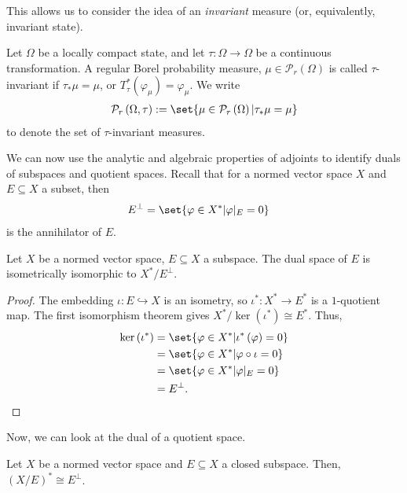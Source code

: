 \documentclass[10pt]{mypackage}
\begin{document}
This allows us to consider the idea of an \textit{invariant} measure (or, equivalently, invariant state).
\begin{definition}
  Let $\Omega$ be a locally compact state, and let $\tau: \Omega\rightarrow\Omega$ be a continuous transformation. A regular Borel probability measure, $\mu\in \mathcal{P}_r\left(\Omega\right)$ is called $\tau$-invariant if $\tau_{\ast}\mu = \mu$, or $T_{\tau}^{\ast}\left(\varphi_{\mu}\right) = \varphi_{\mu}$. We write
  \begin{align*}
    \mathcal{P}_{r}\left(\Omega,\tau\right) := \set{\mu\in \mathcal{P}_{r}\left(\Omega\right)| \tau_{\ast}\mu = \mu}
  \end{align*}
  to denote the set of $\tau$-invariant measures.
\end{definition}
We can now use the analytic and algebraic properties of adjoints to identify duals of subspaces and quotient spaces. Recall that for a normed vector space $X$ and $E\subseteq X$ a subset, then
\begin{align*}
  E^{\perp} &= \set{\varphi\in X^{\ast}| \varphi|_{E} = 0}
\end{align*}
is the annihilator of $E$.
\begin{proposition}
  Let $X$ be a normed vector space, $E\subseteq X$ a subspace. The dual space of $E$ is isometrically isomorphic to $X^{\ast}/E^{\perp}$.
\end{proposition}
\begin{proof}
  The embedding $\iota: E\hookrightarrow X$ is an isometry, so $\iota^{\ast}: X^{\ast}\rightarrow E^{\ast}$ is a $1$-quotient map. The first isomorphism theorem gives $X^{\ast}/\ker\left(\iota^{\ast}\right) \cong E^{\ast}$. Thus,
  \begin{align*}
    \ker\left(\iota^{\ast}\right) &= \set{\varphi\in X^{\ast}| \iota^{\ast}\left(\varphi\right) = 0}\\
                                  &= \set{\varphi\in X^{\ast}| \varphi\circ\iota = 0}\\
                                  &= \set{\varphi\in X^{\ast}| \varphi|_{E} = 0}\\
                                  &= E^{\perp}.
  \end{align*}
\end{proof}
Now, we can look at the dual of a quotient space.
\begin{proposition}
  Let $X$ be a normed vector space and $E\subseteq X$ a closed subspace. Then, $\left(X/E\right)^{\ast} \cong E^{\perp}$.
\end{proposition}
\end{document}
